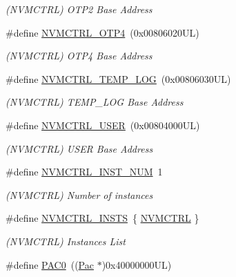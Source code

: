 \begin{DoxyCompactItemize}
\begin{DoxyCompactList}\small\item\em (N\+V\+M\+C\+T\+RL) O\+T\+P2 Base Address \end{DoxyCompactList}\item 
\#define \mbox{\hyperlink{group___s_a_m_d21_e15_l__base_ga138b4aca5a0446a745fe143c1dca8165}{N\+V\+M\+C\+T\+R\+L\+\_\+\+O\+T\+P4}}~(0x00806020\+U\+L)
\begin{DoxyCompactList}\small\item\em (N\+V\+M\+C\+T\+RL) O\+T\+P4 Base Address \end{DoxyCompactList}\item 
\#define \mbox{\hyperlink{group___s_a_m_d21_e15_l__base_gae900d443ec6d7cf1c90d21b6662fa447}{N\+V\+M\+C\+T\+R\+L\+\_\+\+T\+E\+M\+P\+\_\+\+L\+OG}}~(0x00806030\+U\+L)
\begin{DoxyCompactList}\small\item\em (N\+V\+M\+C\+T\+RL) T\+E\+M\+P\+\_\+\+L\+OG Base Address \end{DoxyCompactList}\item 
\#define \mbox{\hyperlink{group___s_a_m_d21_e15_l__base_ga7a7a83a5753fa323b61536e396083c99}{N\+V\+M\+C\+T\+R\+L\+\_\+\+U\+S\+ER}}~(0x00804000\+U\+L)
\begin{DoxyCompactList}\small\item\em (N\+V\+M\+C\+T\+RL) U\+S\+ER Base Address \end{DoxyCompactList}\item 
\#define \mbox{\hyperlink{group___s_a_m_d21_e15_l__base_ga13ad0ecfdddf1ba98ff430146e106ad9}{N\+V\+M\+C\+T\+R\+L\+\_\+\+I\+N\+S\+T\+\_\+\+N\+UM}}~1
\begin{DoxyCompactList}\small\item\em (N\+V\+M\+C\+T\+RL) Number of instances \end{DoxyCompactList}\item 
\#define \mbox{\hyperlink{group___s_a_m_d21_e15_l__base_ga89f9b65723089d64dc46c4c5ac60d1e0}{N\+V\+M\+C\+T\+R\+L\+\_\+\+I\+N\+S\+TS}}~\{ \mbox{\hyperlink{group___s_a_m_d21_j18_a__base_gad18608913d3d6e423f3a79d84348910a}{N\+V\+M\+C\+T\+RL}} \}
\begin{DoxyCompactList}\small\item\em (N\+V\+M\+C\+T\+RL) Instances List \end{DoxyCompactList}\item 
\#define \mbox{\hyperlink{group___s_a_m_d21_e15_l__base_ga193491199100ba87dcdbb8d50837fb62}{P\+A\+C0}}~((\mbox{\hyperlink{struct_pac}{Pac}}      $\ast$)0x40000000\+U\+L)

\end{DoxyCompactItemize}
